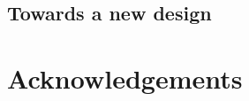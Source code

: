 \documentclass[a4paper, twocolumn]{article}
\begin{document}
% 

% 
% 
% 
% 
% 
% 
% 



\subsection{Towards a new design}

\section*{Acknowledgements} 




\end{document}
